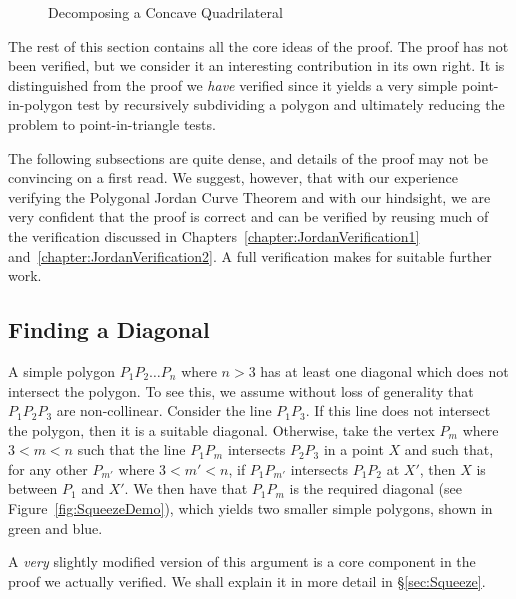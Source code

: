 \begin{figure}
  \centering 

  \caption{Decomposing a Concave Quadrilateral}
  \label{fig:quadDecompose}
\end{figure}

The rest of this section contains all the core ideas of the proof. The proof has not been verified, but we consider it an interesting contribution in its own right. It is distinguished from the proof we \emph{have} verified since it yields a very simple point-in-polygon test by recursively subdividing a polygon and ultimately reducing the problem to point-in-triangle tests.

The following subsections are quite dense, and details of the proof may not be convincing on a first read. We suggest, however, that with our experience verifying the Polygonal Jordan Curve Theorem and with our hindsight, we are very confident that the proof is correct and can be verified by reusing much of the verification discussed in Chapters~\ref{chapter:JordanVerification1} and~\ref{chapter:JordanVerification2}. A full verification makes for suitable further work. 

\subsection{Finding a Diagonal}\label{sec:FindingDiagonal}
A simple polygon $P_1P_2 \ldots P_n$ where $n>3$ has at least one diagonal which does not intersect the polygon. To see this, we assume without loss of generality that $P_1P_2P_3$ are non-collinear. Consider the line $P_1P_3$. If this line does not intersect the polygon, then it is a suitable diagonal. Otherwise, take the vertex $P_m$ where $3 < m < n$ such that the line $P_1P_m$ intersects $P_2P_3$ in a point $X$ and such that, for any other $P_{m'}$ where $3 < m' < n$, if $P_1P_{m'}$ intersects $P_1P_2$ at $X'$, then $X$ is between $P_1$ and $X'$. We then have that $P_1P_m$ is the required diagonal (see Figure~\ref{fig:SqueezeDemo}), which yields two smaller simple polygons, shown in green and blue.

A \emph{very} slightly modified version of this argument is a core component in the proof we actually verified. We shall explain it in more detail in \S\ref{sec:Squeeze}.

